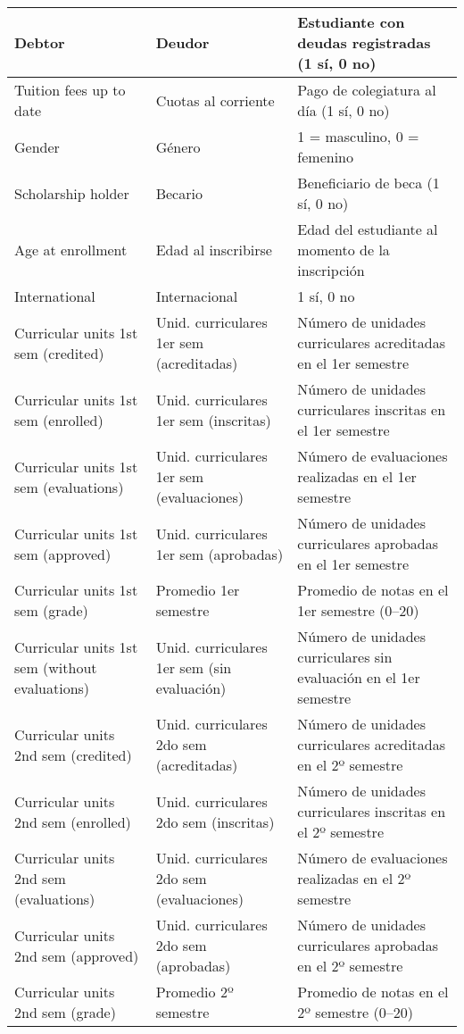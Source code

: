 \begin{table}[H]
\begin{tabular}{|p{5cm}|p{5cm}|p{6cm}|}
Debtor & Deudor & Estudiante con deudas registradas (1 sí, 0 no) \\ \hline
Tuition fees up to date & Cuotas al corriente & Pago de colegiatura al día (1 sí, 0 no) \\ \hline
Gender & Género & 1 = masculino, 0 = femenino \\ \hline
Scholarship holder & Becario & Beneficiario de beca (1 sí, 0 no) \\ \hline
Age at enrollment & Edad al inscribirse & Edad del estudiante al momento de la inscripción \\ \hline
International & Internacional & 1 sí, 0 no \\ \hline
Curricular units 1st sem (credited) & Unid. curriculares 1er sem (acreditadas) & Número de unidades curriculares acreditadas en el 1er semestre \\ \hline
Curricular units 1st sem (enrolled) & Unid. curriculares 1er sem (inscritas) & Número de unidades curriculares inscritas en el 1er semestre \\ \hline
Curricular units 1st sem (evaluations) & Unid. curriculares 1er sem (evaluaciones) & Número de evaluaciones realizadas en el 1er semestre \\ \hline
Curricular units 1st sem (approved) & Unid. curriculares 1er sem (aprobadas) & Número de unidades curriculares aprobadas en el 1er semestre \\ \hline
Curricular units 1st sem (grade) & Promedio 1er semestre & Promedio de notas en el 1er semestre (0–20) \\ \hline
Curricular units 1st sem (without evaluations) & Unid. curriculares 1er sem (sin evaluación) & Número de unidades curriculares sin evaluación en el 1er semestre \\ \hline
Curricular units 2nd sem (credited) & Unid. curriculares 2do sem (acreditadas) & Número de unidades curriculares acreditadas en el 2º semestre \\ \hline
Curricular units 2nd sem (enrolled) & Unid. curriculares 2do sem (inscritas) & Número de unidades curriculares inscritas en el 2º semestre \\ \hline
Curricular units 2nd sem (evaluations) & Unid. curriculares 2do sem (evaluaciones) & Número de evaluaciones realizadas en el 2º semestre \\ \hline
Curricular units 2nd sem (approved) & Unid. curriculares 2do sem (aprobadas) & Número de unidades curriculares aprobadas en el 2º semestre \\ \hline
Curricular units 2nd sem (grade) & Promedio 2º semestre & Promedio de notas en el 2º semestre (0–20) \\ \hline

\end{tabular}
\end{table}
